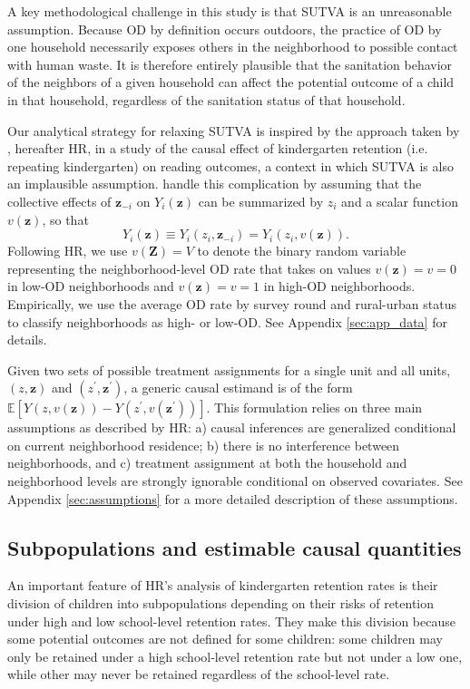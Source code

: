 \documentclass[12pt,a4paper,titlepage]{article}
\begin{document}
A key methodological challenge in this study is that SUTVA is an unreasonable assumption. Because OD by definition occurs outdoors, the practice of OD by one household necessarily exposes others in the neighborhood to possible contact with human waste. It is therefore entirely plausible that the sanitation behavior of the neighbors of a given household can affect the potential outcome of a child in that household, regardless of the sanitation status of that household.

Our analytical strategy for relaxing SUTVA is inspired by the approach taken by \cite{hong_raudenbush}, hereafter HR, in a study of the causal effect of kindergarten retention (i.e. repeating kindergarten) on reading outcomes, a context in which SUTVA is also an implausible assumption. \cite{hong_raudenbush} handle this complication by assuming that the collective effects of $\mathbf{z}_{-i}$ on $Y_i(\mathbf{z})$ can be summarized by $z_i$ and a scalar function $v(\mathbf{z})$, so that
\begin{equation}\label{eq:hr_pot_out}
	Y_i(\mathbf{z}) \equiv Y_i(z_i, \mathbf{z}_{-i}) = Y_i(z_i, v(\mathbf{z})).
\end{equation}
Following HR, we use $v(\mathbf{Z}) = V$ to denote the binary random variable representing the neighborhood-level OD rate that takes on values $v(\mathbf{z}) = v = 0$ in low-OD neighborhoods and $v(\mathbf{z}) = v = 1$ in high-OD neighborhoods. Empirically, we use the average OD rate by survey round and rural-urban status to classify neighborhoods as high- or low-OD. See Appendix \ref{sec:app_data} for details.

Given two sets of possible treatment assignments for a single unit and all units, $(z, \mathbf{z})$ and $(z^{\prime}, \mathbf{z}^{\prime})$, a generic causal estimand is of the form $\mathbb{E}[Y(z, v(\mathbf{z})) - Y(z^{\prime}, v(\mathbf{z}^{\prime}))]$. This formulation relies on three main assumptions as described by HR: a) causal inferences are generalized conditional on current neighborhood residence; b) there is no interference between neighborhoods, and c) treatment assignment at both the household and neighborhood levels are strongly ignorable conditional on observed covariates. See Appendix \ref{sec:assumptions} for a more detailed description of these assumptions.

\subsection{Subpopulations and estimable causal quantities}
An important feature of HR's analysis of kindergarten retention rates is their division of children into subpopulations depending on their risks of retention under high and low school-level retention rates. They make this division because some potential outcomes are not defined for some children: some children may only be retained under a high school-level retention rate but not under a low one, while other may never be retained regardless of the school-level rate.
\end{document}

